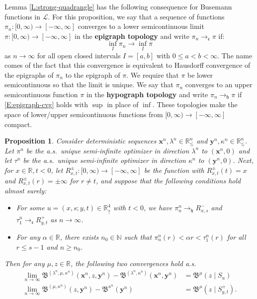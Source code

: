 \documentclass[11pt]{article}
\newcommand{\N}{\mathbb{N}}
\newcommand{\R}{\mathbb{R}}
\newcommand{\ka}{\kappa}
\newcommand{\la}{\lambda}
\newcommand{\al}{\alpha}
\newcommand{\Rd}{\mathbb{R}^4_\uparrow}
\newcommand{\cL}{\mathcal{L}}
\newcommand{\bx}{\mathbf{x}}
\newcommand{\by}{\mathbf{y}}
\newtheorem{proposition}[theorem]{Proposition}
\theoremstyle{definition} %
\theoremstyle{remark} %
\begin{document}
Lemma \ref{L:strong-quadrangle} has the following consequence for Busemann functions in $\cL$. For this proposition, we say that a sequence of functions $\pi_n:[0, \infty) \to [-\infty, \infty]$ converges to a lower semicontinuous limit $\pi:[0, \infty) \to  [-\infty, \infty]$ in the \textbf{epigraph topology} and write $\pi_n \to_{\mathfrak e} \pi$ if:
\begin{equation}
\label{E:epigraph-cvg}
\inf_I \pi_n \to \inf_I \pi
\end{equation}
as $n \to \infty$
for all open closed intervals $I = [a, b]$ with $0 \le a < b < \infty$. The name comes of the fact that this convergence is equivalent to Hausdorff convergence of the epigraphs of $\pi_n$ to the epigraph of $\pi$. We require that $\pi$ be lower semicontinuous so that the limit is unique. We say that $\pi_n$ converges to an upper semicontinuous function $\pi$ in the \textbf{hypograph topology} and write $\pi_n \to_{\mathfrak h} \pi$ if \eqref{E:epigraph-cvg} holds with $\sup$ in place of $\inf$. These topologies make the space of lower/upper semicontinuous functions from $[0, \infty) \to [-\infty, \infty]$ compact.

\begin{proposition}
	\label{P:busemann-quadrangle}
	Consider deterministic sequences $\bx^n, \la^n \in \R^n_\le$ and $\by^n, \kappa^n \in \R^n_\le$. Let $\pi^n$ be the a.s.\ unique semi-infinite optimizer in direction $\la^n$ to $(\bx^n, 0)$ and let $\tau^n$ be the a.s.\ unique semi-infinite optimizer in direction $\ka^n$ to $(\by^n, 0)$. Next, for $x \in \R, t < 0$, let $R_{x, t}^\pm:[0, \infty) \to [-\infty, \infty]$ be the function with $R_{x, t}^\pm(t) = x$ and $R_{x, t}^\pm(r) = \pm \infty$ for $r \ne t$, and suppose that the following conditions hold almost surely:
	\begin{itemize}
		\item For some $u = (x, s; y, t) \in \Rd$ with $t < 0$, we have $\pi^n_n \to_{\mathfrak h} R^-_{x, s}$ and $\tau^n_1 \to_{\mathfrak e} R^+_{y, t}$ as $n \to \infty$.
		\item For any $\al \in \R$, there exists $n_0 \in \N$ such that 
		$
		\pi^n_n(r) < \al r < \tau^n_1(r)  
		$
		for all $r \le s - 1$ and $n \ge n_0$.
	\end{itemize}  
	Then for any $\mu, z \in \R$, the following two convergences hold a.s.
	\begin{align}
	\label{E:slit-convergence}
	\lim_{n \to \infty} \mathfrak B^{(\la^n, \mu, \kappa^n)}(\bx^n, z, \by^n) - \mathfrak B^{(\la^n, \kappa^n)}(\bx^n, \by^n) &= \mathfrak B^{\mu}(z \mid S_u) \\
	\label{E:single-slit-convergence}
	\lim_{n \to \infty} \mathfrak B^{(\mu, \kappa^n)}(z, \by^n) - \mathfrak B^{\kappa^n}(\by^n) &= \mathfrak B^{\mu}(z \mid S_{y, t}^+).
	\end{align}
\end{proposition}
\end{document}
